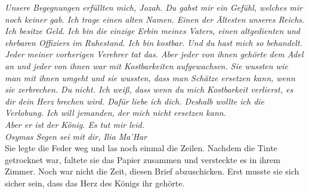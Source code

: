 \textit{Unsere Begegnungen erfüllten mich, Jozah. Du gabst mir ein Gefühl, welches mir noch keiner 
gab. Ich trage einen alten Namen. Einen der Ältesten unseres Reichs. Ich besitze Geld. Ich bin die 
einzige Erbin meines Vaters, einen altgedienten und ehrbaren Offiziers im Ruhestand. Ich bin 
kostbar. Und du hast mich so behandelt. Jeder meiner vorherigen Verehrer tat das. Aber jeder von 
ihnen gehörte dem Adel an und jeder von ihnen war mit Kostbarkeiten aufgewachsen. Sie wussten wie 
man mit ihnen umgeht und sie wussten, dass man Schätze ersetzen kann, wenn sie zerbrechen. Du 
nicht. Ich weiß, dass wenn du mich Kostbarkeit verlierst, es dir dein Herz brechen wird. Dafür 
liebe ich dich. Deshalb wollte ich die Verlobung. Ich will jemanden, der mich nicht ersetzen 
kann.\\}
\textit{Aber er ist der König. Es tut mir leid.}\\

\textit{Osymas Segen sei mit dir,}
\textit{Ilia Ma'Har}\\

Sie legte die Feder weg und las noch einmal die Zeilen. Nachdem die Tinte getrocknet war, faltete 
sie das Papier zusammen und versteckte es in ihrem Zimmer. Noch war nicht die Zeit, diesen Brief 
abzuschicken. Erst musste sie sich sicher sein, dass das Herz des Königs ihr gehörte.
